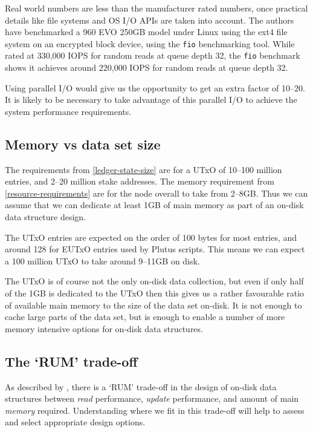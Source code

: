 \documentclass[11pt,a4paper]{article}
\begin{document}
Real world numbers are less than the manufacturer rated numbers, once practical
details like file systems and OS I/O APIs are taken into account. The authors
have benchmarked a 960 EVO 250GB model under Linux using the ext4 file system
on an encrypted block device, using the {\tt fio} benchmarking tool. While
rated at 330,000 IOPS for random reads at queue depth 32, the {\tt fio}
benchmark shows it achieves around 220,000 IOPS for random reads at queue depth
32.

Using parallel I/O would give us the opportunity to get an extra factor of
\texttimes{}10--\texttimes{}20. It is likely to be necessary to take advantage
of this parallel I/O to achieve the system performance requirements.

\subsection{Memory vs data set size}
\label{memory-vs-data-set-size}

The requirements from \cref{ledger-state-size} are for a UTxO of 10--100 million
entries, and 2--20 million stake addresses. The memory requirement from
\cref{resource-requirements} are for the node overall to take from 2--8GB.
Thus we can assume that we can dedicate at least 1GB of main memory as part of
an on-disk data structure design.

The UTxO entries are expected on the order of 100 bytes for most entries, and
around 128 for EUTxO entries used by Plutus scripts. This means we can expect
a 100 million UTxO to take around 9--11GB on disk.

The UTxO is of course not the only on-disk data collection, but even if only
half of the 1GB is dedicated to the UTxO then this gives us a rather favourable
ratio of available main memory to the size of the data set on-disk. It is not
enough to cache large parts of the data set, but is enough to enable a number
of more memory intensive options for on-disk data structures.

\subsection{The `RUM' trade-off}
\label{rum}

As described by \cite{rum-conjecture}, there is a `RUM' trade-off in the design
of on-disk data structures between \emph{read} performance, \emph{update}
performance, and amount of main \emph{memory} required. Understanding where we
fit in this trade-off will help to assess and select appropriate design options.
\end{document}
